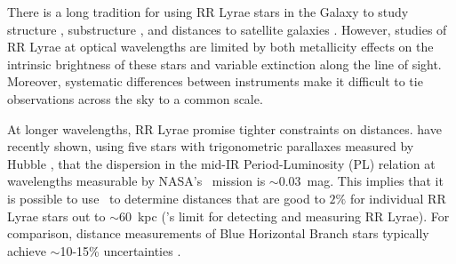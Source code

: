 There is a long tradition for using RR Lyrae stars in the Galaxy to study
structure \citep[e.g.][]{shapley18}, substructure \citep[e.g.][]{sesar10}, and
distances to satellite galaxies \citep[e.g.][]{clementini03}. However, studies
of RR Lyrae at optical wavelengths are limited by both metallicity effects on
the intrinsic brightness of these stars and variable extinction along the line
of sight.  Moreover, systematic differences between instruments make it
difficult to tie observations across the sky to a common scale.

At longer wavelengths, RR Lyrae promise tighter constraints on distances.
\citet{madore12} have recently shown, using five stars with trigonometric
parallaxes measured by Hubble \citep{benedict11}, that the dispersion in the
mid-IR Period-Luminosity (PL) relation \citep[first mapped by][]{longmore86} at
wavelengths measurable by NASA's \spitzer\ mission is $\sim$0.03~mag. This
implies that it is possible to use \spitzer\ to determine distances that are
good to $2\%$ for individual RR Lyrae stars out to $\sim$60~kpc (\spitzer's
limit for detecting and measuring RR Lyrae). For comparison, distance
measurements of Blue Horizontal Branch stars typically achieve $\sim$10-15\%
uncertainties  \citep[if appropriate color measurements are available,
e.g.,][]{deason12b}.

